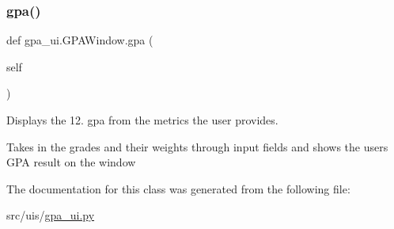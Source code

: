 \subsubsection{\texorpdfstring{gpa()}{gpa()}}
{\footnotesize\ttfamily def gpa\+\_\+ui.\+G\+P\+A\+Window.\+gpa (\begin{DoxyParamCaption}\item[{}]{self }\end{DoxyParamCaption})}



Displays the 12. gpa from the metrics the user provides. 

Takes in the grades and their weights through input fields and shows the users G\+PA result on the window 

The documentation for this class was generated from the following file\+:\begin{DoxyCompactItemize}
\item 
src/uis/\hyperlink{gpa__ui_8py}{gpa\+\_\+ui.\+py}\end{DoxyCompactItemize}
